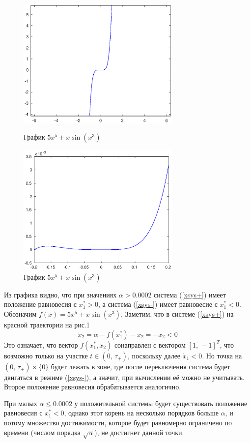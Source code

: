 \documentclass[16pt]{article}
\begin{document}
\begin{figure}[h]
\begin{multicols}{2}
	\hfill
\includegraphics[width=80mm]{eq.eps}
	\hfill
\caption{График $5x^5 + x\sin(x^3)$}
	\hfill
\includegraphics[width=80mm]{eq2.eps}
	\hfill
\caption{График $5x^5 + x\sin(x^3)$}
    \hfill
\end{multicols}
\end{figure}
Из графика видно, что при значениях $\alpha > 0.0002$ система (\ref{xsys+}) имеет положение равновесия с $x_1^* > 0$,
а система (\ref{xsys-}) имеет равновесие с $x_1^* < 0$. Обозначим $f(x) = 5x^5 + x\sin(x^3)$. Заметим, что в системе
(\ref{xsys+}) на красной траектории на рис.1
$$\dot x_2 = \alpha - f(x_1^*) - x_2 = -x_2 < 0$$
Это означает, что вектор $f(x_1^*, x_2)$ сонаправлен с вектором $[1,\, -1]^T$, что возможно только
на участке $t \in (0,\, \tau_+)$, поскольку далее $\dot x_1 < 0$. Но точка на $(0,\, \tau_+)\times \{0\}$
будет лежать в зоне, где после переключения система будет двигаться в режиме (\ref{xsys-}), а значит, при
вычислении её можно не учитывать. Второе положение равновесия обрабатывается аналогично.

При малых $\alpha \leqslant 0.0002$ у положительной системы будет существовать положение равновесия с $x_1^* < 0$,
однако этот корень на несколько порядков больше $\alpha$, и потому множество достижимости, которое будет
равномерно ограничено по времени (числом порядка $\sqrt{\alpha}$), не достигнет данной точки.
\end{document}
